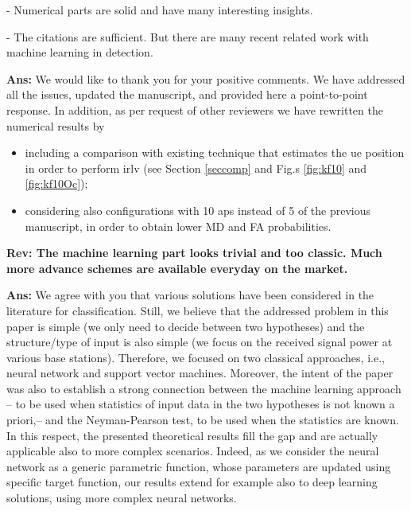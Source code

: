 \documentclass[draftcls,onecolumn,12pt]{IEEEtran}
\begin{document}
{\begin{framed}
{- Numerical parts are solid and have many interesting insights. 

- The citations are sufficient. But there are many recent related work with machine learning in detection.
}
\end{framed}


{\bf Ans:} We would like to thank you for your positive comments. We have addressed all the issues, updated the manuscript, and provided here a point-to-point response. In addition, as per request of other reviewers we have rewritten the numerical results by 
\begin{itemize}
    \item including a comparison with existing technique that estimates the \ac{ue} position in order to perform \ac{irlv} (see Section \ref{seccomp} and Fig.s \ref{fig:kf10} and \ref{fig:kf10Oc});
    \item considering also configurations with 10 \acp{ap} instead of 5 of the previous manuscript, in order to obtain lower MD and FA probabilities.
\end{itemize}


\vspace{5mm} %
\begin{framed}
{\bf Rev: The machine learning part looks trivial and too classic. Much more advance schemes are available everyday on the market.}
\end{framed}
 

{\bf Ans:} We agree with you that various solutions have been considered in the literature for classification. Still, we believe that the addressed problem in this paper is simple (we only need to decide between two hypotheses) and the structure/type of input is also simple (we focus on the received signal power at various base stations). Therefore, we focused on two classical approaches, i.e., neural network and support vector machines. Moreover, the intent of the paper was also to establish a strong connection between the machine learning approach -- to be used when statistics of input data in the two hypotheses is not known a priori,-- and the Neyman-Pearson test, to be used when the statistics are known. In this respect, the presented theoretical results fill the gap and are actually applicable also to more complex scenarios. Indeed, as we consider the neural network as a generic parametric function, whose parameters are updated using specific target function, our results extend for example also to deep learning solutions, using more complex neural networks.

}
\end{document}
